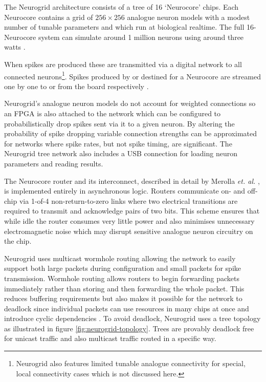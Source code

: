 				The Neurogrid architecture consists of a tree of 16 `Neurocore' chips.
				Each Neurocore contains a grid of $256 \times 256$ analogue neuron
				models with a modest number of tunable parameters and which run at
				biological realtime. The full 16-Neurocore system can simulate around 1
				million neurons using around three watts \cite{benjamin14}.
				
				When spikes are produced these are transmitted via a digital network to
				all connected neurons\footnote{Neurogrid also features limited tunable
				analogue connectivity for special, local connectivity cases which is not
				discussed here.}. Spikes produced by or destined for a Neurocore are
				streamed one by one to or from the board respectively
				\cite{boahen04,boahen04receiver}.
				
				Neurogrid's analogue neuron models do not account for weighted
				connections so an FPGA is also attached to the network which can be
				configured to probabilistically drop spikes sent via it to a given
				neuron. By altering the probability of spike dropping variable
				connection strengths can be approximated for networks where spike rates,
				but not spike timing, are significant. The Neurogrid tree network also
				includes a USB connection for loading neuron parameters and reading
				results. 
				
				The Neurocore router and its interconnect, described in detail by
				Merolla \emph{et. al.} \cite{merolla14}, is implemented entirely in
				asynchronous logic. Routers communicate on- and off-chip via 1-of-4
				non-return-to-zero links where two electrical transitions are
				required to transmit and acknowledge pairs of two bits. This scheme
				ensures that while idle the router consumes very little power and also
				minimises unnecessary electromagnetic noise which may disrupt sensitive
				analogue neuron circuitry on the chip.
				
				Neurogrid uses multicast wormhole routing allowing the network to easily
				support both large packets during configuration and small packets for
				spike transmission. Wormhole routing allows routers to begin forwarding
				packets immediately rather than storing and then forwarding the whole
				packet. This reduces buffering requirements but also makes it possible
				for the network to deadlock since individual packets can use resources
				in many chips at once and introduce cyclic dependencies \cite{dally04}.
				To avoid deadlock, Neurogrid uses a tree topology as illustrated in
				figure \ref{fig:neurogrid-topology}.  Trees are provably deadlock free
				for unicast traffic and also multicast traffic routed in a specific way.
				
